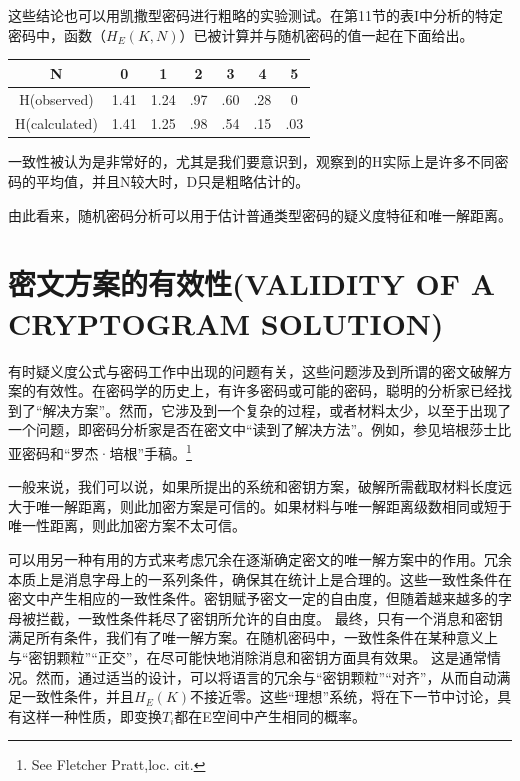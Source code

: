 \documentclass[]{article}
\begin{document}
这些结论也可以用凯撒型密码进行粗略的实验测试。在第11节的表I中分析的特定密码中，函数（$H_E(K,N)$）已被计算并与随机密码的值一起在下面给出。\par
\vspace{0.5cm}
\begin{minipage}{\textwidth}
	\centering
		\begin{tabular}{c|c|c|c|c|c|c}
			\hline 
			N& 0 & 1 & 2 & 3 & 4 & 5 \\ 
			\hline 
			H(observed)& 1.41 & 1.24 & .97 & .60 & .28 & 0 \\ 
			\hline 
			H(calculated)& 1.41 & 1.25 & .98 & .54 & .15 & .03 \\ 
			\hline 
		\end{tabular} 
\end{minipage}
\par
\vspace{0.5cm}
一致性被认为是非常好的，尤其是我们要意识到，观察到的H实际上是许多不同密码的平均值，并且N较大时，D只是粗略估计的。

由此看来，随机密码分析可以用于估计普通类型密码的疑义度特征和唯一解距离。

\newpage
%   
%

\section{密文方案的有效性(VALIDITY OF A CRYPTOGRAM SOLUTION)}

有时疑义度公式与密码工作中出现的问题有关，这些问题涉及到所谓的密文破解方案的有效性。在密码学的历史上，有许多密码或可能的密码，聪明的分析家已经找到了“解决方案”。然而，它涉及到一个复杂的过程，或者材料太少，以至于出现了一个问题，即密码分析家是否在密文中“读到了解决方法”。例如，参见培根莎士比亚密码和“罗杰·培根”手稿。\footnote{ See Fletcher Pratt,loc. cit.}

一般来说，我们可以说，如果所提出的系统和密钥方案，破解所需截取材料长度远大于唯一解距离，则此加密方案是可信的。如果材料与唯一解距离级数相同或短于唯一性距离，则此加密方案不太可信。

可以用另一种有用的方式来考虑冗余在逐渐确定密文的唯一解方案中的作用。冗余本质上是消息字母上的一系列条件，确保其在统计上是合理的。这些一致性条件在密文中产生相应的一致性条件。密钥赋予密文一定的自由度，但随着越来越多的字母被拦截，一致性条件耗尽了密钥所允许的自由度。
最终，只有一个消息和密钥满足所有条件，我们有了唯一解方案。在随机密码中，一致性条件在某种意义上与“密钥颗粒”“正交”，在尽可能快地消除消息和密钥方面具有效果。
这是通常情况。然而，通过适当的设计，可以将语言的冗余与“密钥颗粒”“对齐”，从而自动满足一致性条件，并且$H_E(K)$不接近零。这些“理想”系统，将在下一节中讨论，具有这样一种性质，即变换$T_i$都在E空间中产生相同的概率。
\end{document}
